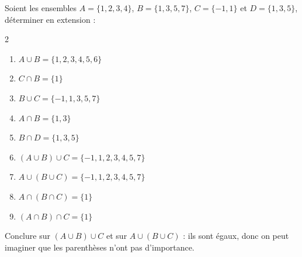 \begin{solution}
Soient les ensembles $A=\{1,2,3,4\}$, $B=\{1,3,5,7\}$, $C= \{-1,1\}$ et $D = \{1,3,5\}$, déterminer en extension :
\begin{multicols}2
	\begin{enumerate}
	\item $ A\cup B = \{1,2,3,4,5,6\}$
	\item $ C \cap B = \{1\} $
	\item $ B \cup C  = \{-1,1,3,5,7\}$
	\item $ A \cap B = \{1,3\}$
	\item $ B \cap D = \{1,3,5\}$
	\item $ (A\cup B)\cup C = \{-1,1,2,3,4,5,7\}$
	\item $ A \cup (B\cup C) = \{-1,1,2,3,4,5,7\}$
	\item $ A \cap (B\cap C) = \{1\}$
	\item $ (A \cap B) \cap C = \{1\}$
	\end{enumerate}
\end{multicols}
Conclure sur $ (A\cup B)\cup C $ et sur $ A \cup (B \cup C) $ : ils sont égaux, donc on peut imaginer que les parenthèses n'ont pas d'importance.
\end{solution}